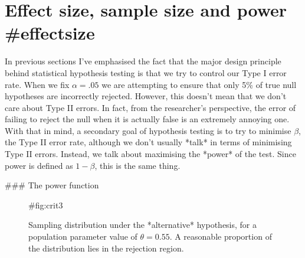 \section{Effect size, sample size and power {#effectsize}}

In previous sections I've emphasised the fact that the major design principle behind statistical hypothesis testing is that we try to control our Type I error rate. When we fix $\alpha = .05$ we are attempting to ensure that only 5\% of true null hypotheses are incorrectly rejected. However, this doesn't mean that we don't care about Type II errors. In fact, from the researcher's perspective, the error of failing to reject the null when it is actually false is an extremely annoying one. With that in mind, a secondary goal of hypothesis testing is to try to minimise $\beta$, the Type II error rate, although we don't usually *talk* in terms of minimising Type II errors. Instead, we talk about maximising the *power* of the test. Since power is defined as $1-\beta$, this is the same thing. 


### The power function

\begin{figure}
\begin{center}
\caption{Sampling distribution under the *alternative* hypothesis, for a population parameter value of $\theta = 0.55$. A reasonable proportion of the distribution lies in the rejection region.}
\HR
{#fig:crit3}
\end{center}
\end{figure}

